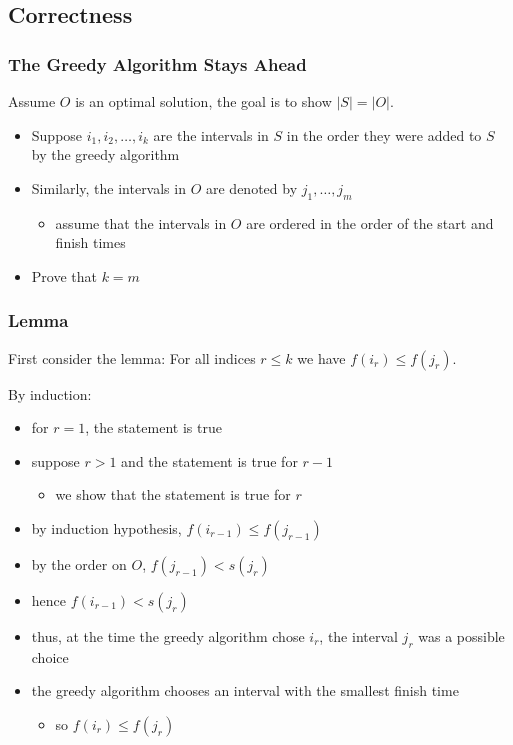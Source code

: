 \documentclass[11pt]{article}
\begin{document}
\subsection{Correctness}
\label{sec:orge3c4610}
\subsubsection{The Greedy Algorithm Stays Ahead}
\label{sec:orgef4100f}
Assume \(O\) is an optimal solution, the goal is to show \(|S| = |O|\).

\begin{itemize}
\item Suppose \(i_{1}, i_{2}, \dots, i_{k}\) are the intervals in \(S\) in the
order they were added to \(S\) by the greedy algorithm
\item Similarly, the intervals in \(O\) are denoted by \(j_{1}, \dots, j_{m}\)
\begin{itemize}
\item assume that the intervals in \(O\) are ordered in the order of the
start and finish times
\end{itemize}
\item Prove that \(k = m\)
\end{itemize}
\subsubsection{Lemma}
\label{sec:org58c001b}
First consider the lemma:
For all indices \(r \le k\) we have \(f(i_{r}) \le f(j_{r})\).

By induction:
\begin{itemize}
\item for \(r = 1\), the statement is true
\item suppose \(r > 1\) and the statement is true for \(r - 1\)
\begin{itemize}
\item we show that the statement is true for \(r\)
\end{itemize}
\item by induction hypothesis, \(f(i_{r-1}) \le f(j_{r-1})\)
\item by the order on \(O\), \(f(j_{r-1}) < s(j_{r})\)
\item hence \(f(i_{r-1}) < s(j_{r})\)
\item thus, at the time the greedy algorithm chose \(i_{r}\),
the interval \(j_{r}\) was a possible choice
\item the greedy algorithm chooses an interval with the smallest finish time
\begin{itemize}
\item so \(f(i_{r}) \le f(j_{r})\)
\end{itemize}
\end{itemize}
\end{document}
